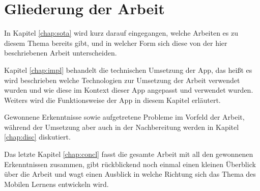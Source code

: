 \section{Gliederung der Arbeit}
\label{sec:Gliederung}

In Kapitel \ref{chap:sota} wird kurz darauf eingegangen, welche Arbeiten es zu diesem Thema bereits 
gibt, und in welcher Form sich diese von der hier beschriebenen Arbeit unterscheiden. 

Kapitel \ref{chap:impl} behandelt die technischen Umsetzung der App, das heißt es wird 
beschrieben welche Technologien zur Umsetzung der Arbeit verwendet wurden und wie diese im 
Kontext dieser App angepasst und verwendet wurden. Weiters wird die Funktionsweise der App in diesem
Kapitel erläutert.

Gewonnene Erkenntnisse sowie aufgetretene Probleme im Vorfeld der Arbeit, während der Umsetzung aber auch in der Nachbereitung
werden in Kapitel \ref{chap:disc} diskutiert.

Das letzte Kapitel \ref{chap:concl} fasst die gesamte Arbeit mit all den gewonnenen Erkenntnissen
zusammen, gibt rückblickend noch einmal einen kleinen Überblick über die Arbeit und wagt einen Ausblick in welche 
Richtung sich das Thema des Mobilen Lernens entwickeln wird.



